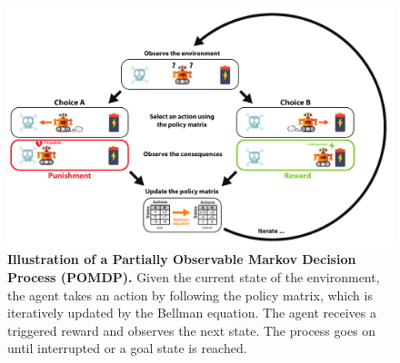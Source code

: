 \documentclass[10pt,letterpaper]{article}
\begin{document}
\begin{figure}[!h]
  \centering
  \includegraphics[width=1.\linewidth]{POMDP_Fig.pdf}
  \caption{\textbf{Illustration of a Partially Observable Markov Decision Process (POMDP).} Given the current state of the environment,
    the agent takes an action by following the policy matrix, which is iteratively updated by the Bellman equation. The agent receives a triggered reward and observes the next state. The process goes on until interrupted or a goal state is reached.}
  \label{fig:rl}
\end{figure}
\end{document}
